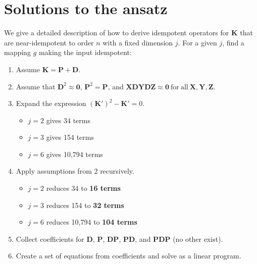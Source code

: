 \documentclass{article}
\theoremstyle{plain}
\theoremstyle{definition}
\theoremstyle{remark}
\newcommand{\vD}{\mathbf{D}}
\newcommand{\vK}{\mathbf{K}}
\newcommand{\vP}{\mathbf{P}}
\newcommand{\vX}{\mathbf{X}}
\newcommand{\vY}{\mathbf{Y}}
\newcommand{\vZ}{\mathbf{Z}}
\begin{document}
\section{Solutions to the ansatz}
\label{app:solutions}
We give a detailed description of how to derive idempotent operators for $\vK$ that are near-idempotent to order $n$ with a fixed dimension $j$. For a given $j$, find a mapping $g$ making the input idempotent:
\begin{enumerate}
    \item Assume $\vK = \vP + \vD$.
    \item {Assume that $\vD^2 \approx \bm{0}$, $\vP^2 = \vP$, and $\vX \vD \vY \vD \vZ \approx \bm{0} \mathrm{~for~all~} \vX,\vY,\vZ$.}
    \item {Expand the expression $(\vK')^2 - \vK' = 0$.
          \begin{itemize}
              \item $j = 2$ gives 34 terms
              \item $j = 3$ gives 154 terms
              \item $j = 6$ gives 10,794 terms
          \end{itemize}
          }
    \item {Apply assumptions from 2 recursively.
          \begin{itemize}
              \item $j = 2$ reduces 34 to \textbf{16 terms}
              \item $j = 3$ reduces 154 to \textbf{32 terms}
              \item $j = 6$ reduces 10,794 to \textbf{104 terms}
          \end{itemize}
          }
    \item Collect coefficients for $\vD$, $\vP$, $\vD\vP$, $\vP\vD$, and $\vP\vD\vP$ (no other exist).
    \item Create a set of equations from coefficients and solve as a linear program.
\end{enumerate}
\end{document}
